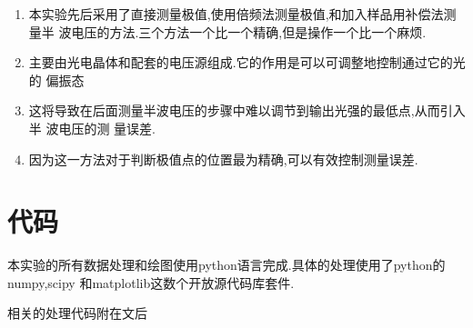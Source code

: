 \documentclass[aps,pre,12pt,preprint,onecolumn,showpacs,showkeys]{revtex4-1}
\begin{document}
\begin{enumerate}
    \item
        本实验先后采用了直接测量极值,使用倍频法测量极值,和加入样品用补偿法测量半
        波电压的方法.三个方法一个比一个精确,但是操作一个比一个麻烦.
    \item
        主要由光电晶体和配套的电压源组成.它的作用是可以可调整地控制通过它的光的
        偏振态
    \item
        这将导致在后面测量半波电压的步骤中难以调节到输出光强的最低点,从而引入半
        波电压的测
        量误差.
    \item
        因为这一方法对于判断极值点的位置最为精确,可以有效控制测量误差.
\end{enumerate}

\section{代码}

本实验的所有数据处理和绘图使用python语言完成.具体的处理使用了python的numpy,scipy
和matplotlib这数个开放源代码库套件.

相关的处理代码附在文后



\end{document}
